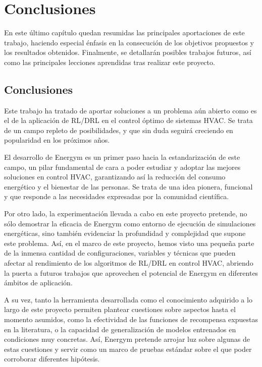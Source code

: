 \chapter{Conclusiones}
\label{ch:5}

En este último capítulo quedan resumidas las principales aportaciones de este trabajo, haciendo especial énfasis en la consecución de los objetivos propuestos y los resultados obtenidos. Finalmente, se detallarán posibles trabajos futuros, así como las principales lecciones aprendidas tras realizar este proyecto.

\section{Conclusiones}

Este trabajo ha tratado de aportar soluciones a un problema aún abierto como es el de la aplicación de RL/DRL en el control óptimo de sistemas HVAC. Se trata de un campo repleto de posibilidades, y que sin duda seguirá creciendo en popularidad en los próximos años.

El desarrollo de Energym es un primer paso hacia la estandarización de este campo, un pilar fundamental de cara a poder estudiar y adoptar las mejores soluciones en control HVAC, garantizando así la reducción del consumo energético y el bienestar de las personas. Se trata de una idea pionera, funcional y que responde a las necesidades expresadas por la comunidad científica.

Por otro lado, la experimentación llevada a cabo en este proyecto pretende, no sólo demostrar la eficacia de Energym como entorno de ejecución de simulaciones energéticas, sino también evidenciar la profundidad y complejidad que supone este problema. Así, en el marco de este proyecto, hemos visto una pequeña parte de la inmensa cantidad de configuraciones, variables y técnicas que pueden afectar al rendimiento de los algoritmos de RL/DRL en control HVAC, abriendo la puerta a futuros trabajos que aprovechen el potencial de Energym en diferentes ámbitos de aplicación. 

A su vez, tanto la herramienta desarrollada como el conocimiento adquirido a lo largo de este proyecto permiten plantear cuestiones sobre aspectos hasta el momento asumidos, como la efectividad de las funciones de recompensa expuestas en la literatura, o la capacidad de generalización de modelos entrenados en condiciones muy concretas. Así, Energym pretende arrojar luz sobre algunas de estas cuestiones y servir como un marco de pruebas estándar sobre el que poder corroborar diferentes hipótesis.

